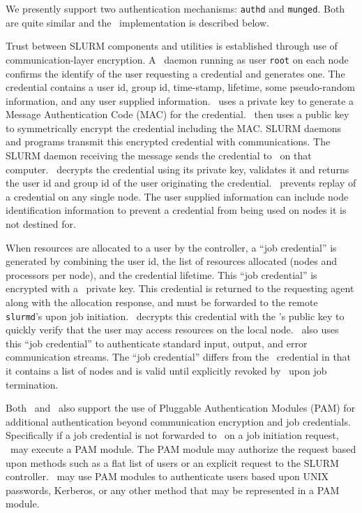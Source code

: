 We presently support two authentication mechanisms: 
{\tt authd}\cite{Authd2002} and 
{\tt munged}. Both are quite similar and the \munged\ 
implementation is described below.

Trust between SLURM components and utilities is established through use
of communication-layer encryption. A \munged\ daemon running as 
user {\tt root} on each node confirms the identify of the user requesting 
a credential and generates one. The credential contains a user id, 
group id, time-stamp, lifetime, some pseudo-random information, and 
any user supplied information. \munged\ uses a private key to 
generate a Message Authentication Code (MAC) for the credential.
\munged\ then uses a public key to symmetrically encrypt 
the credential including the MAC. 
SLURM daemons and programs transmit this encrypted 
credential with communications. The SLURM daemon receiving the message 
sends the credential to \munged\ on that computer. 
\munged\ decrypts the credential using its private key, validates it 
and returns the user id and group id of the user originating the 
credential.
\munged\ prevents replay of a credential on any single node. 
The user supplied information can include node identification information 
to prevent a credential from being used on nodes it is not destined for.

When resources are allocated to a user by the controller, a ``job 
credential'' is generated by combining the user id, the list of
resources allocated (nodes and processors per node), and the credential
lifetime. This ``job credential'' is encrypted with a \slurmctld\ private key. 
This credential is returned to the requesting agent along with the
allocation response, and must be forwarded to the remote {\tt slurmd}'s 
upon job initiation. \slurmd\ decrypts this credential with the
\slurmctld 's public key to quickly verify that the user may access
resources on the local node. \slurmd\ also uses this ``job credential'' 
to authenticate standard input, output, and error communication streams. 
The ``job credential'' differs from the \munged\ credential in that 
it contains a list of nodes and is valid until explicitly revoked by 
\slurmctld\ upon job termination.

Both \slurmd\ and \slurmctld\ also support the use
of Pluggable Authentication Modules (PAM) for additional authentication 
beyond communication encryption and job credentials. Specifically if a
job credential is not forwarded to \slurmd\ on a job initiation request,
\slurmd\ may execute a PAM module.
The PAM module may authorize the request
based upon methods such as a flat list of users or an explicit request
to the SLURM controller. \slurmctld\ may use PAM modules to authenticate
users based upon UNIX passwords, Kerberos, or any other method that
may be represented in a PAM module.

